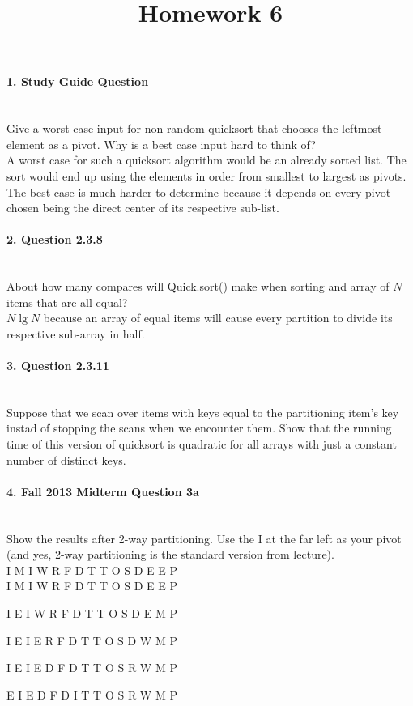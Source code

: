 \documentclass{article}
\begin{document}
\title{Homework 6}
\date{}
\maketitle



\paragraph{\Large 1. Study Guide Question}\mbox{}\\
Give a worst-case input for non-random quicksort that chooses the leftmost element as a pivot. Why is a best case input hard to think of?\\

A worst case for such a quicksort algorithm would be an already sorted list. The sort would end up using the elements in order from smallest to largest as pivots. The best case is much harder to determine because it depends on every pivot chosen being the direct center of its respective sub-list.

\paragraph{\Large 2. Question 2.3.8}\mbox{}\\
About how many compares will Quick.sort() make when sorting and array of $N$ items that are all equal?\\

$N \lg N$ because an array of equal items will cause every partition to divide its respective sub-array in half.

\paragraph{\Large 3. Question 2.3.11}\mbox{}\\
Suppose that we scan over items with keys equal to the partitioning item's key instad of stopping the scans when we encounter them. Show that the running time of this version of quicksort is quadratic for all arrays with just a constant number of distinct keys.\\


\paragraph{\Large 4. Fall 2013 Midterm Question 3a}\mbox{}\\
Show the results after 2-way partitioning. Use the I at
the far left as your pivot (and yes, 2-way partitioning
is the standard version from lecture).\\
I M I W R F D T T O S D E E P\\

I M I W R F D T T O S D E E P

I E I W R F D T T O S D E M P

I E I E R F D T T O S D W M P

I E I E D F D T T O S R W M P

E I E D F D I T T O S R W M P
\end{document}
